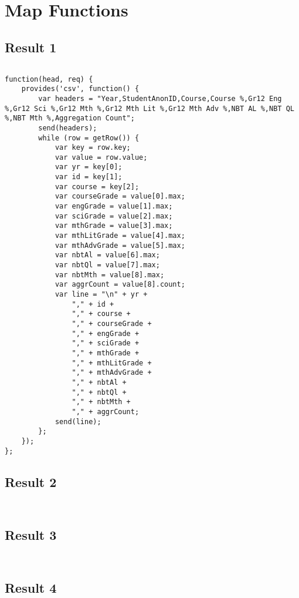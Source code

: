 \section{Map Functions}
\subsection{Result 1}
\label{result-1-map}
\begin{verbatim}
\end{verbatim}
\label{result-1-list}
\begin{verbatim}
function(head, req) {
    provides('csv', function() {
        var headers = "Year,StudentAnonID,Course,Course %,Gr12 Eng %,Gr12 Sci %,Gr12 Mth %,Gr12 Mth Lit %,Gr12 Mth Adv %,NBT AL %,NBT QL %,NBT Mth %,Aggregation Count";
        send(headers);
        while (row = getRow()) {
            var key = row.key;
            var value = row.value;
            var yr = key[0];
            var id = key[1];
            var course = key[2];
            var courseGrade = value[0].max;
            var engGrade = value[1].max;
            var sciGrade = value[2].max;
            var mthGrade = value[3].max;
            var mthLitGrade = value[4].max;
            var mthAdvGrade = value[5].max;
            var nbtAl = value[6].max;
            var nbtQl = value[7].max;
            var nbtMth = value[8].max;
            var aggrCount = value[8].count;
            var line = "\n" + yr +
                "," + id +
                "," + course +
                "," + courseGrade +
                "," + engGrade +
                "," + sciGrade +
                "," + mthGrade +
                "," + mthLitGrade +
                "," + mthAdvGrade +
                "," + nbtAl +
                "," + nbtQl +
                "," + nbtMth +
                "," + aggrCount;
            send(line);
        };
    });
};
\end{verbatim}

\subsection{Result 2}
\label{result-2-map}
\begin{verbatim}
\end{verbatim}
\label{result-2-list}
\begin{verbatim}
\end{verbatim}

\subsection{Result 3}
\label{result-3-map}
\begin{verbatim}
\end{verbatim}
\label{result-3-list}
\begin{verbatim}
\end{verbatim}

\subsection{Result 4}
\label{result-4-map}
\begin{verbatim}
\end{verbatim}
\label{result-4-list}
\begin{verbatim}
\end{verbatim}

